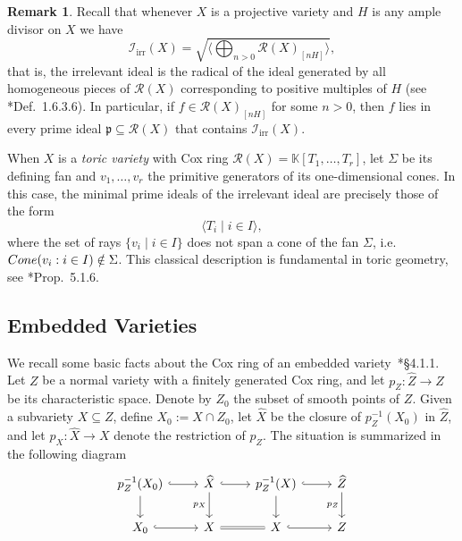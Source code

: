\documentclass{amsart}
\theoremstyle{definition}
\newtheorem{remark}[theorem]{Remark}
\theoremstyle{remark}
\begin{document}
\begin{remark}\label{rem:irrelevant-ideal}
Recall that whenever $X$ is a projective variety and $H$ is any ample divisor on $X$ we have
\[
\mathscr I_{\mathrm{irr}}(X) =
\sqrt{\big\langle \bigoplus_{n>0} \mathcal R(X)_{[nH]} \big\rangle},
\]
that is, the irrelevant ideal is the radical of the ideal generated by all homogeneous pieces of $\mathcal R(X)$
corresponding to positive multiples of $H$ (see \cite{adhl}*{Def.~1.6.3.6}).
In particular, if $f \in \mathcal R(X)_{[nH]}$ for some $n>0$,
then $f$ lies in every prime ideal $\mathfrak p \subseteq \mathcal R(X)$ that contains
$\mathscr I_{\mathrm{irr}}(X)$.

When $X$ is a \emph{toric variety} with Cox ring
\(\mathcal R(X)=\mathbb K[T_1,\dots,T_r]\),
let $\Sigma$ be its defining fan and
$v_1,\dots,v_r$ the primitive generators of its one-dimensional cones.
In this case, the minimal prime ideals of the irrelevant ideal are precisely those of the form
\[
\langle T_i \mid i \in I \rangle,
\]
where the set of rays $\{v_i \mid i \in I\}$ does not span a cone of the fan $\Sigma$, i.e.
\({\rm Cone}(v_i : i \in I) \notin \Sigma\).
This classical description is fundamental in toric geometry, see
\cite{cls}*{Prop.~5.1.6}.
\end{remark}

\subsection{Embedded Varieties}
We recall some basic facts about the Cox ring of an embedded variety~\cite{adhl}*{\S 4.1.1}.
Let $Z$ be a normal variety with a finitely generated Cox ring, and let $p_Z \colon \widehat{Z} \to Z$ be its characteristic space.
Denote by $Z_0$ the subset of smooth points of $Z$. Given a subvariety $X \subseteq Z$,
define $X_0 := X \cap Z_0$, let
$ \widehat{X}$ be the closure of
$p_Z^{-1}(X_0)$ in $\widehat Z$, and let
$p_X\colon \widehat{X}\to X$ denote the
restriction of $p_Z$. The
situation is summarized in the following
diagram
\[
\begin{tikzcd}
p_Z^{-1}(X_0) \arrow[d] \arrow[r, hook]
& \widehat{X} \arrow[d, "p_X"'] \arrow[r, hook]
& p_Z^{-1}(X) \arrow[d] \arrow[r, hook]
& \widehat{Z} \arrow[d, "p_Z"'] \\
X_0 \arrow[r, hook] & X \arrow[r, equals] & X \arrow[r, hook] & Z
\end{tikzcd}
\]
\end{document}
